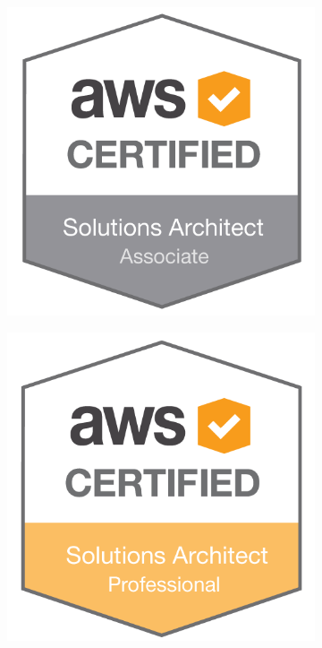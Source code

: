 \documentclass[]{cv-a4}
\begin{document}
\begin{figure}[h!]
  \centering
  \begin{subfigure}[b]{0.2\linewidth}
    \includegraphics[width=\linewidth]{images/SAA.png}
  \end{subfigure}
  \begin{subfigure}[b]{0.2\linewidth}
    \includegraphics[width=\linewidth]{images/SAP.png}

\end{subfigure}
\end{figure}
\end{document}
